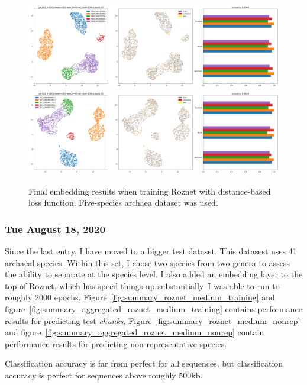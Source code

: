 \documentclass{article}
\begin{document}
\begin{figure}
  \includegraphics[width=\linewidth]{new_journal/figures/ar122_r89.genomic.small/ddp/g4_b32_lr0.001/seed=2001-epoch=80-val_loss=2.98.outputs.png}
  \includegraphics[width=\linewidth]{new_journal/figures/ar122_r89.genomic.small/ddp/g4_b32_lr0.001/seed=2001-epoch=95-val_loss=3.98.outputs.png}
  \caption{Final embedding results when training Roznet with distance-based loss function. Five-species archaea dataset was used.  }
  \label{fig:g4_b32_lr0.001}
\end{figure}



\subsubsection*{Tue August 18, 2020}
Since the last entry, I have moved to a bigger test dataset. This datasest uses 41 archaeal species. Within this set, I chose two species from two genera to assess
the ability to separate at the species level. I also added an embedding layer to the top of Roznet, which has speed things up substantially--I was able to run to
roughly 2000 epochs. Figure~\ref{fig:summary_roznet_medium_training} and figure~\ref{fig:summary_aggregated_roznet_medium_training} contains performance results for predicting test \emph{chunks}.
Figure~\ref{fig:summary_roznet_medium_nonrep} and figure~\ref{fig:summary_aggregated_roznet_medium_nonrep} contain performance results for predicting non-representative species.

Classification accuracy is far from perfect for all sequences, but classification accuracy is perfect for sequences above roughly 500kb.
\end{document}
